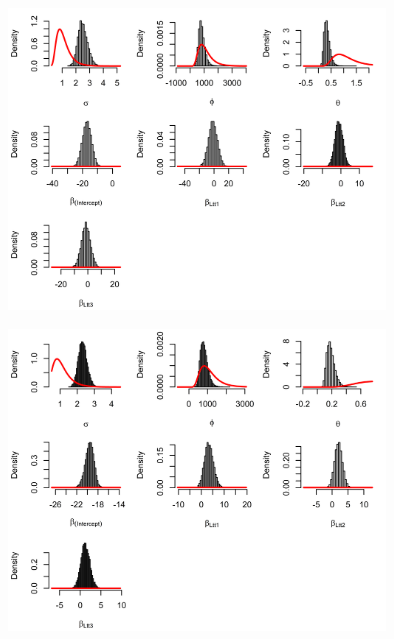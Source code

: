 \begin{appendices}
    \begin{figure}[H]
        \begin{center}
            \includegraphics[width = \linewidth, height = 80mm]{Prior and posterior density plots - Major 2.png}
        \end{center}
    \end{figure}

    \begin{figure}[H]
        \begin{center}
            \includegraphics[width = \linewidth, height = 80mm]{Prior and posterior density plots - Major 13456.png}
        \end{center}
    \end{figure}

    \newpage



\end{appendices}
